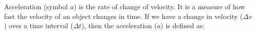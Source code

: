       \label{m38794*id67562}Acceleration (symbol \begin{math}a\end{math}) is the rate of change of velocity. It is a measure of how fast the velocity of an object changes in time. If we have a change in velocity (\begin{math}\Delta v\end{math}) over a time interval (\begin{math}\Delta t\end{math}), then the acceleration (\begin{math}a\end{math}) is defined as:\par 
      \label{m38794*id67610}\nopagebreak\noindent{}

